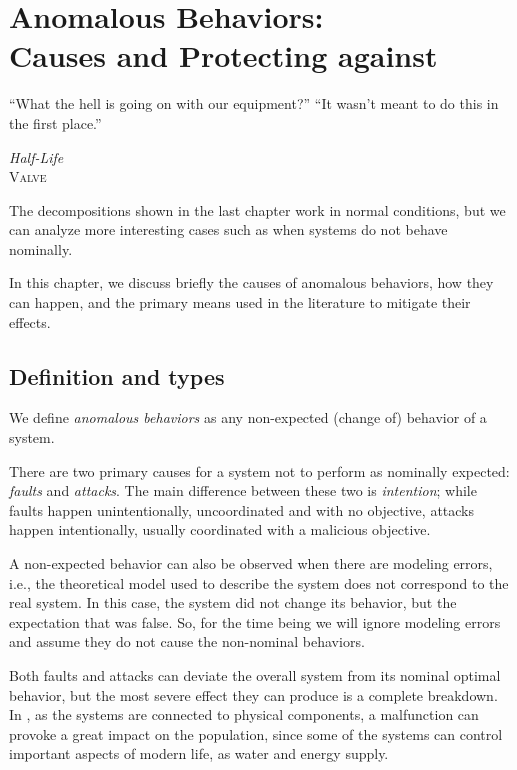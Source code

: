 \documentclass[../main.tex]{subfiles}
\begin{document}
\chapter[Anomalous Behaviors - Causes and Protecting against]{Anomalous Behaviors:\\ Causes and Protecting against}\label{sec:anomalous}


\epigraph{``What the hell is going on with our equipment?''
``It wasn't meant to do this in the first place.''}
{\textit{Half-Life}\\\textsc{Valve}}

The decompositions shown in the last chapter work in normal conditions, but we can analyze more interesting cases such as when systems do not behave nominally.

In this chapter, we discuss briefly the causes of anomalous behaviors, how they can happen, and the primary means used in the literature to mitigate their effects.

\minitoc%

\section{Definition and types}
We define \emph{anomalous behaviors} as any non-expected (change of) behavior of a system.

There are two primary causes for a system not to perform as nominally expected: \emph{faults} and \emph{attacks}.
The main difference between these two is \emph{intention}; while faults happen unintentionally, uncoordinated and with no objective, attacks happen intentionally, usually coordinated with a malicious objective.

\begin{remark}
  A non-expected behavior can also be observed when there are modeling errors, i.e., the theoretical model used to describe the system does not correspond to the real system.
  In this case, the system did not change its behavior, but the expectation that was false.
  So, for the time being we will ignore modeling errors and assume they do not cause the non-nominal behaviors.
\end{remark}

Both faults and attacks can deviate the overall system from its nominal optimal behavior, but the most severe effect they can produce is a complete breakdown.
In \cps{}, as the systems are connected to physical components, a malfunction can provoke a great impact on the population, since some of the systems can control important
aspects of modern life, as water and energy supply.
\end{document}
